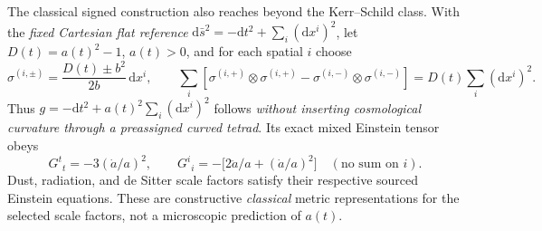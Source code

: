 \documentclass[11pt,a4paper]{article}
\newcommand{\dd}{\mathrm d}
\begin{document}
The classical signed construction also reaches beyond the Kerr--Schild class.  With the \emph{fixed Cartesian flat reference} $\dd\bar s^2=-\dd t^2+\sum_i(\dd x^i)^2$, let $D(t)=a(t)^2-1$, $a(t)>0$, and for each spatial $i$ choose
\begin{equation}\label{eq:qgd060-FLRW-sectors}
 \sigma^{(i,\pm)}=\frac{D(t)\pm b^2}{2b}\,\dd x^i,\qquad
 \sum_i[\sigma^{(i,+)}\!\otimes\sigma^{(i,+)}-
 \sigma^{(i,-)}\!\otimes\sigma^{(i,-)}]
 =D(t)\sum_i(\dd x^i)^2.
\end{equation}
Thus $g=-\dd t^2+a(t)^2\sum_i(\dd x^i)^2$ follows \emph{without inserting cosmological curvature through a preassigned curved tetrad}.  Its exact mixed Einstein tensor obeys
\begin{equation}\label{eq:qgd060-FLRW-Einstein}
 G^t{}_t=-3(\dot a/a)^2,\qquad
 G^i{}_i=-\bigl[2\ddot a/a+(\dot a/a)^2\bigr]\quad(\text{no sum on }i).
\end{equation}
Dust, radiation, and de Sitter scale factors satisfy their respective sourced Einstein equations.  These are constructive \emph{classical} metric representations for the selected scale factors, not a microscopic prediction of $a(t)$.
\end{document}
